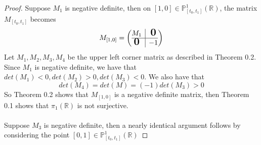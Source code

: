 \documentclass{article}
\newcommand{\bigzero}{\mbox{\normalfont\Large\bfseries 0}}
\newcommand{\Rbb}{\mathbb{R}}
\newcommand{\Pbb}{\mathbb{P}}
\begin{document}
\begin{proof}
Suppose $M_1$ is negative definite, then on $[1, 0] \in \Pbb^{1}_{[t_0, t_1]}(\Rbb)$, the matrix $M_{[t_0, t_1]}$ becomes
\[M_{[1, 0]} = \left(\begin{array}{@{}c|c@{}}
  \begin{matrix}
    M_1
  \end{matrix}
  & \bigzero \\
\hline
  \bigzero &
  \begin{matrix}
  -1
  \end{matrix}
\end{array}\right)\]
Let $M_1, M_2, M_3, M_4$ be the upper left corner matrix as described in Theorem 0.2. Since $M_1$ is negative definite, we have that $det(M_1) < 0, det(M_2) > 0, det(M_3) < 0$. We also have that
\[det(M_4) = det(M) = (-1)det(M_3) > 0\]
So Theorem 0.2 shows that $M_{[1, 0]}$ is a negative definite matrix, then Theorem 0.1 shows that $\pi_1(\Rbb)$ is not surjective.\\\\
Suppose $M_3$ is negative definite, then a nearly identical argument follows by considering the point $[0, 1] \in \Pbb^{1}_{[t_0, t_1]}(\Rbb)$
\end{proof}
\end{document}
